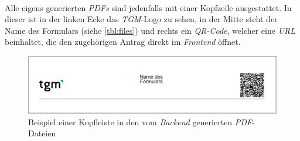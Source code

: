 ~\\
Alle eigens generierten \textit{PDFs} sind jedenfalls mit einer Kopfzeile ausgestattet. In dieser ist in der linken Ecke das \textit{TGM}-Logo zu sehen, in der Mitte steht der Name des Formulars (siehe \autoref{tbl:files}) und rechts ein \textit{QR-Code}, welcher eine \textit{URL} beinhaltet, die den zugehörigen Antrag direkt im \textit{Frontend} öffnet.

\begin{figure}[H]
	\centering
	\includegraphics[width=\linewidth]{images/mbeier_konzept/Kopfleiste_PDF_border}
	\caption[Kopfleiste \textit{PDF}-Datei]{Beispiel einer Kopfleiste in den vom \textit{Backend} generierten \textit{PDF}-Dateien}
	\label{fig:kopfleiste-pdf}
\end{figure}


